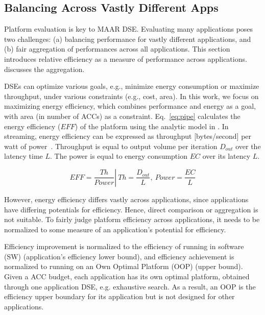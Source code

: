 \vspace{-2pt}
\subsection{Balancing Across Vastly Different Apps}
\label{subsec:relativeEff}

Platform evaluation is key to MAAR DSE. Evaluating many applications poses two challenges: (a) balancing performance for vastly different applications, and (b) fair aggregation of performances across all applications. This section introduces relative efficiency as a measure of performance across applications.  discusses the aggregation.

DSEs can optimize various goals, e.g., minimize energy consumption or maximize throughput, under various constraints (e.g., cost, area). In this work, we focus on maximizing energy efficiency, which combines performance and energy as a goal, with area (in number of ACCs) as a constraint. Eq.~\eqref{eq:pipe} calculates the energy efficiency ($EFF$) of the platform using the analytic model in . In streaming, energy efficiency can be expressed as throughput [bytes/second] per watt of power~\cite{zhou2013energy}. Throughput is equal to output volume per iteration $D_{out}$ over the latency time $L$. The power is equal to energy consumption $EC$ over its latency $L$.

\vspace{-8pt}
\begin{equation}
	EFF = \left. \frac{Th}{Power} \right\vert\ Th = \frac{D_{out}}{L},\ Power = \frac{EC}{L}
\label{eq:pipe}
\end{equation}

However, energy efficiency differs vastly across applications, since applications have differing potentials for efficiency. Hence, direct comparison or aggregation is not suitable. To fairly judge platform efficiency across applications, it needs to be normalized to some measure of an application's potential for efficiency.

Efficiency improvement is normalized to the efficiency of running in software (SW) (application's efficiency lower bound), and efficiency achievement is normalized to running on an Own Optimal Platform (OOP) (upper bound). Given a ACC budget, each application has its own optimal platform, obtained through one application DSE, e.g. exhaustive search. As a result, an OOP is the efficiency upper boundary for its application but is not designed for other applications.

